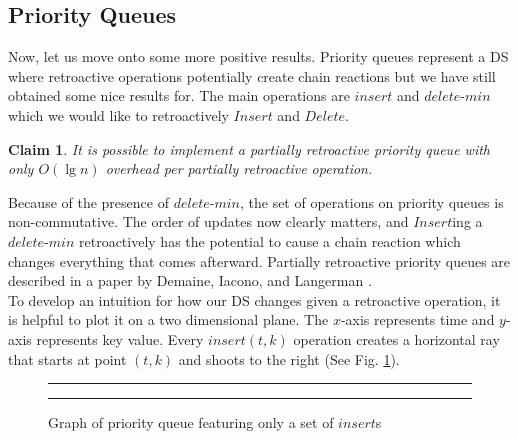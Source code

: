 \documentclass[11pt]{article}
\newtheorem{claim}[theorem]{Claim}
\begin{document}
\subsection{Priority Queues}
Now, let us move onto some more positive results.  Priority queues represent a DS where retroactive operations potentially create chain reactions but we have still obtained some nice results for.  The main operations are $insert$ and $delete$-$min$ which we would like to retroactively $Insert$ and $Delete$.

\begin{claim}
	It is possible to implement a partially retroactive priority queue with only $O(\lg n)$ overhead per partially retroactive operation.
\end{claim}

Because of the presence of $delete$-$min$, the set of operations on priority queues is non-commutative.  The order of updates now clearly matters, and $Insert$ing a $delete$-$min$ retroactively has the potential to cause a chain reaction which changes everything that comes afterward. Partially retroactive priority queues are described in a paper by Demaine, Iacono, and Langerman \cite{dil}. \\

To develop an intuition for how our DS changes given a retroactive operation, it is helpful to plot it on a two dimensional plane.  The $x$-axis represents time and $y$-axis represents key value. Every $insert(t,k)$ operation creates a horizontal ray that starts at point $(t,k)$ and shoots to the right (See Fig. \ref{fig-pqinsert}).

\begin{figure}[ht]
	\rule{\textwidth}{0.005in}
  \begin{center}
  \end{center}

  \caption{\small Graph of priority queue featuring only a set of $insert$s}
  \label{fig-pqinsert}
	\rule{\textwidth}{0.005in}
\end{figure}
\end{document}
